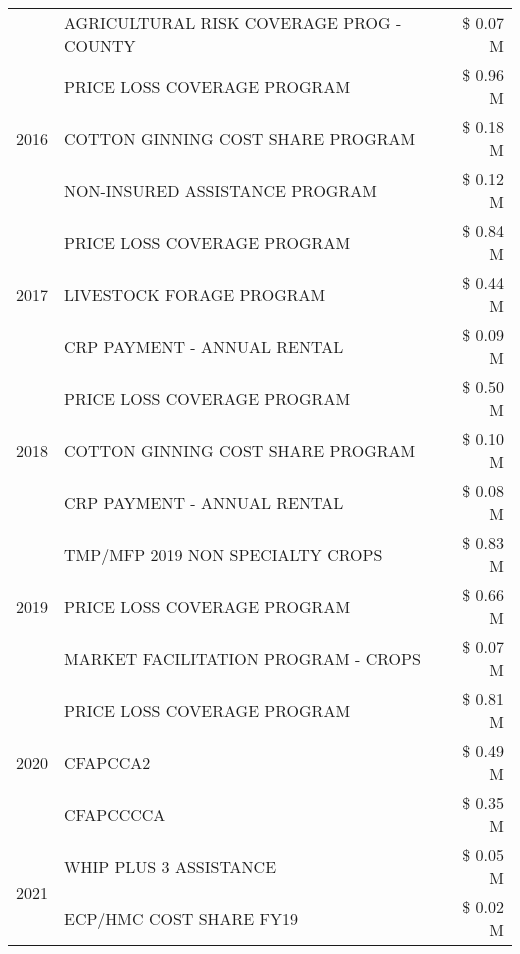 \begin{tabular}{llr}
 & AGRICULTURAL RISK COVERAGE PROG - COUNTY & \$ 0.07 M \\
\cline{1-3}
\multirow[t]{3}{*}{2016} & PRICE LOSS COVERAGE PROGRAM                   & \$ 0.96 M \\
 & COTTON GINNING COST SHARE PROGRAM             & \$ 0.18 M \\
 & NON-INSURED ASSISTANCE PROGRAM                & \$ 0.12 M \\
\cline{1-3}
\multirow[t]{3}{*}{2017} & PRICE LOSS COVERAGE PROGRAM & \$ 0.84 M \\
 & LIVESTOCK FORAGE PROGRAM & \$ 0.44 M \\
 & CRP PAYMENT - ANNUAL RENTAL & \$ 0.09 M \\
\cline{1-3}
\multirow[t]{3}{*}{2018} & PRICE LOSS COVERAGE PROGRAM & \$ 0.50 M \\
 & COTTON GINNING COST SHARE PROGRAM & \$ 0.10 M \\
 & CRP PAYMENT - ANNUAL RENTAL & \$ 0.08 M \\
\cline{1-3}
\multirow[t]{3}{*}{2019} & TMP/MFP 2019 NON SPECIALTY CROPS & \$ 0.83 M \\
 & PRICE LOSS COVERAGE PROGRAM & \$ 0.66 M \\
 & MARKET FACILITATION PROGRAM - CROPS & \$ 0.07 M \\
\cline{1-3}
\multirow[t]{3}{*}{2020} & PRICE LOSS COVERAGE PROGRAM & \$ 0.81 M \\
 & CFAPCCA2 & \$ 0.49 M \\
 & CFAPCCCCA & \$ 0.35 M \\
\cline{1-3}
\multirow[t]{2}{*}{2021} & WHIP PLUS 3 ASSISTANCE & \$ 0.05 M \\
 & ECP/HMC COST SHARE FY19 & \$ 0.02 M \\
\cline{1-3}
\bottomrule
\end{tabular}

